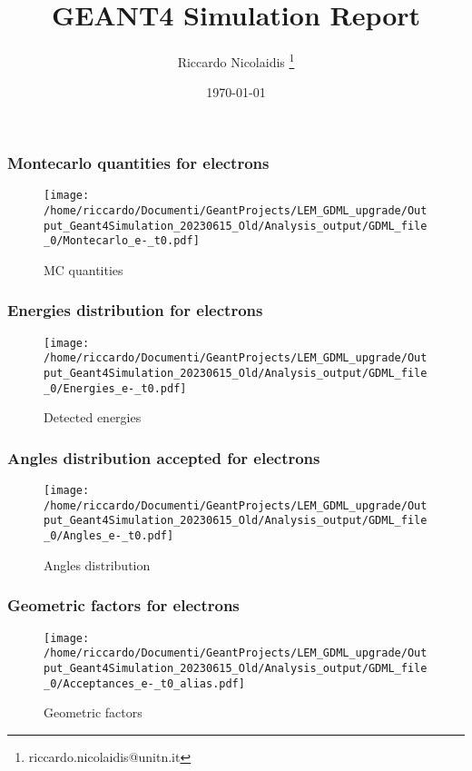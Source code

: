 \documentclass[8pt]{beamer}
\title{GEANT4 Simulation Report}
\author{Riccardo Nicolaidis \footnote{riccardo.nicolaidis@unitn.it}}
\date{\today}
\begin{document}
        
        \begin{frame}
            \titlepage
        \end{frame}
        
        \begin{frame}
            \frametitle{Montecarlo quantities for electrons}
        
        \begin{figure}[h]
            \centering
            \texttt{[image: /home/riccardo/Documenti/GeantProjects/LEM\_GDML\_upgrade/Output\_Geant4Simulation\_20230615\_Old/Analysis\_output/GDML\_file\_0/Montecarlo\_e-\_t0.pdf]}
            \caption{MC quantities}
        \end{figure}
        
        \end{frame}
        
        \begin{frame}
            \frametitle{Energies distribution for electrons}
        
        \begin{figure}[h]
            \centering
            \texttt{[image: /home/riccardo/Documenti/GeantProjects/LEM\_GDML\_upgrade/Output\_Geant4Simulation\_20230615\_Old/Analysis\_output/GDML\_file\_0/Energies\_e-\_t0.pdf]}
            \caption{Detected energies}
        \end{figure}
        
        \end{frame}
        
        \begin{frame}
            \frametitle{Angles distribution accepted for electrons}
        
        \begin{figure}[h]
            \centering
            \texttt{[image: /home/riccardo/Documenti/GeantProjects/LEM\_GDML\_upgrade/Output\_Geant4Simulation\_20230615\_Old/Analysis\_output/GDML\_file\_0/Angles\_e-\_t0.pdf]}
            \caption{Angles distribution}
        \end{figure}
        
        \end{frame}
        
        \begin{frame}
            \frametitle{Geometric factors for electrons}
        
        \begin{figure}[h]
            \centering
            \texttt{[image: /home/riccardo/Documenti/GeantProjects/LEM\_GDML\_upgrade/Output\_Geant4Simulation\_20230615\_Old/Analysis\_output/GDML\_file\_0/Acceptances\_e-\_t0\_alias.pdf]}
            \caption{Geometric factors}
        \end{figure}
        
        \end{frame}
        
\end{document}
